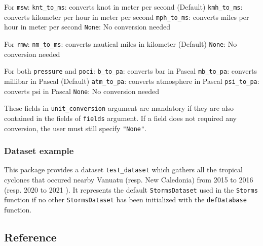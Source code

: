 \documentclass[
]{article}
\begin{document}
For \texttt{msw}: \newline \texttt{knt\_to\_ms}: converts knot in meter
per second (Default) \newline \texttt{kmh\_to\_ms}: converts kilometer
per hour in meter per second \newline \texttt{mph\_to\_ms}: converts
miles per hour in meter per second \newline \texttt{None}: No conversion
needed \newline

For \texttt{rmw}: \newline \texttt{nm\_to\_ms}: converts nautical miles
in kilometer (Default) \newline \texttt{None}: No conversion needed
\newline

For both \texttt{pressure} and \texttt{poci}: \newline
\texttt{b\_to\_pa}: converts bar in Pascal \newline \texttt{mb\_to\_pa}:
converts millibar in Pascal (Default) \newline \texttt{atm\_to\_pa}:
converts atmosphere in Pascal \newline \texttt{psi\_to\_pa}: converts
psi in Pascal \newline \texttt{None}: No conversion needed \newline

These fields in \texttt{unit\_conversion} argument are mandatory if they
are also contained in the fields of \texttt{fields} argument. If a field
does not required any conversion, the user must still specify
\texttt{"None"}.

\hypertarget{dataset-example}{%
\subsubsection{Dataset example}\label{dataset-example}}

This package provides a dataset \texttt{test\_dataset} which gathers all
the tropical cyclones that occured nearby Vanuatu (resp. New Caledonia)
from 2015 to 2016 (resp. 2020 to 2021 ). It represents the default
\texttt{StormsDataset} used in the \texttt{Storms} function if no other
\texttt{StormsDataset} has been initialized with the
\texttt{defDatabase} function.

\hypertarget{reference}{%
\subsection{Reference}\label{reference}}
\end{document}
